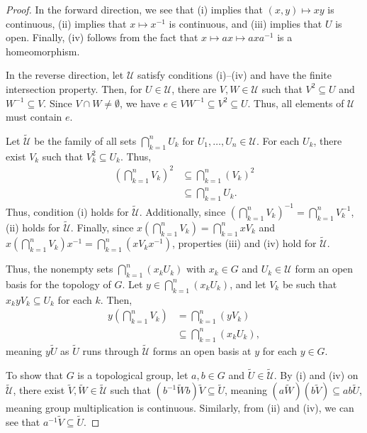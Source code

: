 \documentclass[10pt]{extarticle}
\theoremstyle{plain}
\theoremstyle{definition}
\theoremstyle{note}
\renewcommand{\newline}{\hfill\break}
\begin{document}
\begin{proof}
  In the forward direction, we see that (i) implies that $(x,y)\mapsto xy$ is continuous, (ii) implies that $x\mapsto x^{-1}$ is continuous, and (iii) implies that $U$ is open. Finally, (iv) follows from the fact that $x\mapsto ax \mapsto axa^{-1}$ is a homeomorphism.\newline

  In the reverse direction, let $\mathcal{U}$ satisfy conditions (i)--(iv) and have the finite intersection property. Then, for $U\in \mathcal{U}$, there are $V,W\in\mathcal{U}$ such that $V^2 \subseteq U$ and $W^{-1}\subseteq V$. Since $V\cap W\neq \emptyset$, we have $e\in VW^{-1}\subseteq V^2 \subseteq U$. Thus, all elements of $\mathcal{U}$ must contain $e$.\newline

  Let $\tilde{\mathcal{U}}$ be the family of all sets $\bigcap_{k=1}^{n}U_k$ for $U_1,\dots,U_n \in \mathcal{U}$. For each $U_{k}$, there exist $V_k$ such that $V_k^2 \subseteq U_k$. Thus,
  \begin{align*}
    \left(\bigcap_{k=1}^{n}V_k\right)^2 &\subseteq \bigcap_{k=1}^{n}\left(V_k\right)^2\\
                                        &\subseteq \bigcap_{k=1}^{n}U_k.
  \end{align*}
  Thus, condition (i) holds for $\tilde{\mathcal{U}}$. Additionally, since $\left(\bigcap_{k=1}^{n}V_k\right)^{-1} = \bigcap_{k=1}^{n}V_k^{-1}$, (ii) holds for $\tilde{\mathcal{U}}$. Finally, since $x\left(\bigcap_{k=1}^{n}V_k\right) = \bigcap_{k=1}^{n}xV_k$ and $x\left(\bigcap_{k=1}^{n}V_k\right)x^{-1} = \bigcap_{k=1}^{n}\left(xV_kx^{-1}\right)$, properties (iii) and (iv) hold for $\tilde{\mathcal{U}}$.\newline

  Thus, the nonempty sets $\bigcap_{k=1}^{n}\left(x_kU_k\right)$ with $x_k\in G$ and $U_k\in \mathcal{U}$ form an open basis for the topology of $G$. Let $y\in \bigcap_{k=1}^{n}\left(x_kU_k\right)$, and let $V_k$ be such that $x_kyV_k \subseteq U_k$ for each $k$. Then,
  \begin{align*}
    y\left(\bigcap_{k=1}^{n}V_k\right) &= \bigcap_{k=1}^{n}\left(yV_k\right)\\
                                       &\subseteq \bigcap_{k=1}^{n}\left(x_kU_k\right),
  \end{align*}
  meaning $y\tilde{U}$ as $\tilde{U}$ runs through $\tilde{\mathcal{U}}$ forms an open basis at $y$ for each $y\in G$.\newline

  To show that $G$ is a topological group, let $a,b\in G$ and $\tilde{U} \in \tilde{\mathcal{U}}$. By (i) and (iv) on $\tilde{\mathcal{U}}$, there exist $\tilde{V},\tilde{W}\in \tilde{\mathcal{U}}$ such that $\left(b^{-1}\tilde{W}b\right)\tilde{V}\subseteq \tilde{U}$, meaning $\left(a\tilde{W}\right)\left(b\tilde{V}\right) \subseteq ab\tilde{U}$, meaning group multiplication is continuous. Similarly, from (ii) and (iv), we can see that $a^{-1}\tilde{V} \subseteq \tilde{U}$.
\end{proof}
\end{document}
